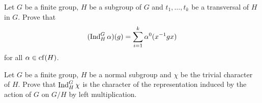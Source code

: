 \begin{exercise}
\label{xca:useful_Ind}
    Let $G$ be a finite group, $H$ be a subgroup
    of $G$ and $t_1,\dots,t_k$ be a transversal
    of $H$ in $G$. Prove that
    \[
    (\operatorname{Ind}_H^G\alpha)(g)=\sum_{i=1}^k\alpha^0(x^{-1}gx)
    \]
    for all $\alpha\in\operatorname{cf}(H)$.
\end{exercise}

\begin{exercise}
\label{xca:induction_G/H}
    Let $G$ be a finite group, $H$ be a normal
    subgroup and $\chi$ be the trivial
    character of $H$. Prove that
    $\operatorname{Ind}_H^G\chi$ is the character of the
    representation induced by the action of $G$ on $G/H$ by left multiplication. 
\end{exercise}



